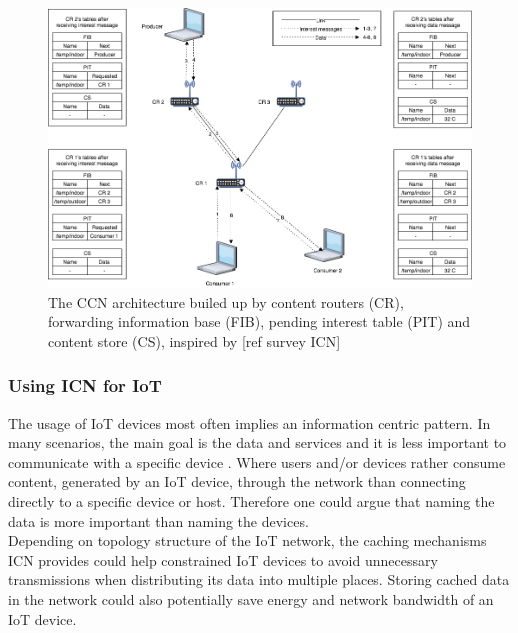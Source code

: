 \begin{figure}
	\includegraphics[width=\textwidth]{figures/CCN-architecture.png}
	\caption{The CCN architecture builed up by content routers (CR), forwarding information base (FIB), pending interest table (PIT) and content store (CS), inspired by [ref survey ICN]}
	\label{fig:CCN-architecture}
\end{figure}



\subsubsection{Using ICN for IoT}
The usage of IoT devices most often implies an information centric pattern. In many scenarios, the main goal is the data and services and it is less important to communicate with a specific device \cite{Ahlgreniot}. Where users and/or devices rather consume content, generated by an IoT device, through the network than connecting directly to a specific device or host. Therefore one could argue that naming the data is more important than naming the devices.\\
Depending on topology structure of the IoT network, the caching mechanisms ICN provides could help constrained IoT devices to avoid unnecessary transmissions when distributing its data into multiple places. Storing cached data in the network could also potentially save energy and network bandwidth of an IoT device.

